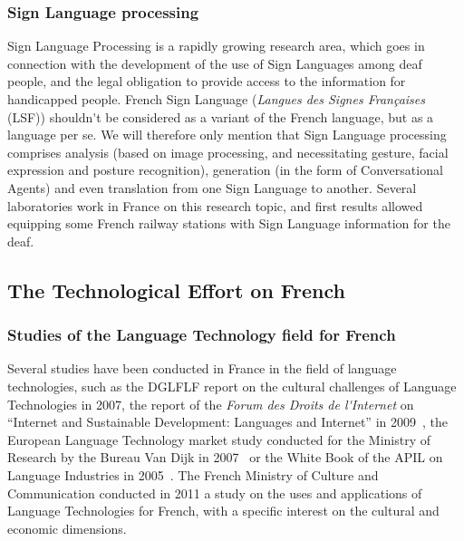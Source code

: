 \begin{multicols}{2}
\subsubsection{Sign Language processing}

Sign Language Processing is a rapidly growing research area, which
goes in connection with the development of the use of Sign Languages
among deaf people, and the legal obligation to provide access to the
information for handicapped people. French Sign Language ({\em Langues des
Signes Françaises} (LSF)) shouldn{\mbox '}t be considered as a variant of the
French language, but as a language per se. We will therefore only
mention that Sign Language processing comprises analysis (based on
image processing, and necessitating gesture, facial expression and
posture recognition), generation (in the form of Conversational
Agents) and even translation from one Sign Language to
another. Several laboratories work in France on this research topic,
and first results allowed equipping some French railway stations with
Sign Language information for the deaf.

\subsection{The Technological Effort on French}

\subsubsection{Studies of the Language Technology field for French}

Several studies have been conducted in France in the field of language
technologies, such as the DGLFLF report on the cultural challenges of
Language Technologies in 2007\cite{dglflf07}, the report of the {\em Forum des Droits de
l{\mbox '}Internet} on ``Internet and Sustainable Development: Languages and Internet'' in 2009~\cite{droitsinternet07}, the
European Language Technology market study conducted for the Ministry
of Research by the Bureau Van Dijk in 2007~\cite{vandijk07} or the White Book of the
APIL on Language Industries in 2005~\cite{apil05}. The French Ministry of Culture
and Communication conducted in 2011 a study on the uses and
applications of Language Technologies for French, with a specific
interest on the cultural and economic dimensions.


\end{multicols}
